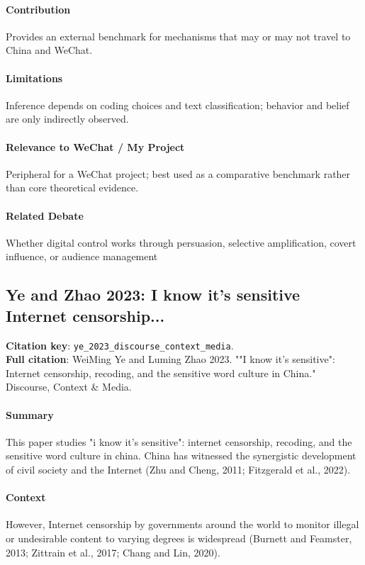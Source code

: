 \documentclass[12pt]{article}
\begin{document}
\paragraph{Contribution} Provides an external benchmark for mechanisms that may or may not travel to China and WeChat.

\paragraph{Limitations} Inference depends on coding choices and text classification; behavior and belief are only indirectly observed.

\paragraph{Relevance to WeChat / My Project} Peripheral for a WeChat project; best used as a comparative benchmark rather than core theoretical evidence.

\paragraph{Related Debate} Whether digital control works through persuasion, selective amplification, covert influence, or audience management


\subsection{Ye and Zhao 2023: I know it's sensitive Internet censorship...}
\textbf{Citation key}: \texttt{ye\_2023\_discourse\_context\_media}.\\
\textbf{Full citation}: WeiMing Ye and Luming Zhao 2023. ""I know it's sensitive": Internet censorship, recoding, and the sensitive word culture in China." Discourse, Context \& Media.

\paragraph{Summary} This paper studies "i know it's sensitive": internet censorship, recoding, and the sensitive word culture in china. China has witnessed the synergistic development of civil society and the Internet (Zhu and Cheng, 2011; Fitzgerald et al., 2022).

\paragraph{Context} However, Internet censorship by governments around the world to monitor illegal or undesirable content to varying degrees is widespread (Burnett and Feamster, 2013; Zittrain et al., 2017; Chang and Lin, 2020).
\end{document}
